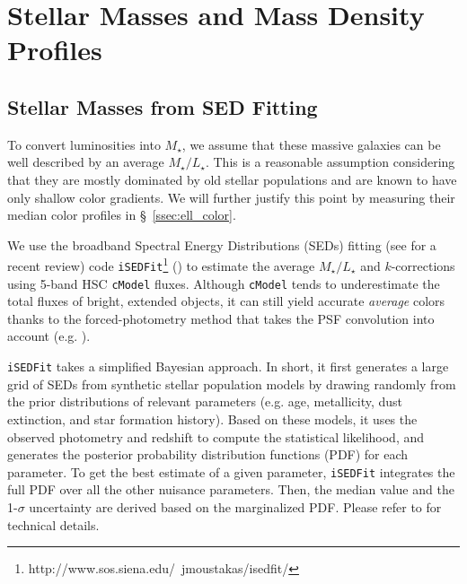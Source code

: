 \documentclass[a4paper,fleqn,usenatbib]{mnras}
\def\cmodel{\texttt{cModel}}
\def\mstar{{$M_{\star}$}}
\def\m2l{{$M_{\star}/L_{\star}$}}
\begin{document}
    
\section{Stellar Masses and Mass Density Profiles}
    \label{sec:mstar}
    
\subsection{Stellar Masses from SED Fitting}
    \label{ssec:isedfit}
   
    To convert luminosities into \mstar{}, we assume that these massive galaxies 
    can be well described by an average \m2l{}. 
    This is a reasonable assumption considering that they are mostly dominated by 
    old stellar populations and are known to have only shallow color gradients. 
    We will further justify this point by measuring their median color profiles in 
    \S~\ref{ssec:ell_color}.

    We use the broadband Spectral Energy Distributions (SEDs) fitting 
    (see \citealt{Walcher2011} for a recent review) code 
    \texttt{iSEDFit}\footnote{http://www.sos.siena.edu/~jmoustakas/isedfit/} 
    (\citealt{Moustakas13}) to estimate the average \m2l{} and $k$-corrections using
    5-band HSC \cmodel{} fluxes.
    Although \cmodel{} tends to underestimate the total fluxes of bright, extended 
    objects, it can still yield accurate \emph{average} colors thanks to the 
    forced-photometry method that takes the PSF convolution into account
    (e.g. \citealt{SynPipe}). 

    \texttt{iSEDFit} takes a simplified Bayesian approach. 
    In short, it first generates a large grid of SEDs from synthetic stellar 
    population models by drawing randomly from the prior distributions of relevant
    parameters (e.g. age, metallicity, dust extinction, and star formation history).
    Based on these models, it uses the observed photometry and redshift to compute 
    the statistical likelihood, and generates the posterior probability distribution 
    functions (PDF) for each parameter.  
    To get the best estimate of a given parameter, \texttt{iSEDFit} integrates the 
    full PDF over all the other nuisance parameters.
    Then, the median value and the 1-$\sigma$ uncertainty are derived based on the 
    marginalized PDF. 
    Please refer to \citet{Moustakas13} for technical details. 
    
\end{document}
